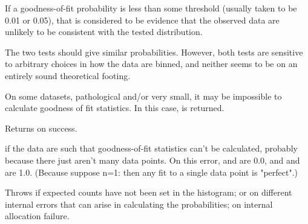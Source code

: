 \begin{sreapi}
If a goodness-of-fit probability is less than some threshold
(usually taken to be 0.01 or 0.05), that is considered to
be evidence that the observed data are unlikely to be consistent
with the tested distribution.

The two tests should give similar
probabilities. However, both tests are sensitive to
arbitrary choices in how the data are binned, and
neither seems to be on an entirely sound theoretical
footing.

On some datasets, pathological and/or very small, it may
be impossible to calculate goodness of fit
statistics. In this case,  is returned.

Returns  on success.

 if the data are such that goodness-of-fit
statistics can't be calculated, probably because there
just aren't many data points. On this error, 
and  are 0.0, and  and  are
1.0. (Because suppose n=1: then any fit to a single data
point is "perfect".)

Throws  if expected counts have not been set in
the histogram;  or  on different internal
errors that can arise in calculating the probabilities;
 on internal allocation failure.


\end{sreapi}

